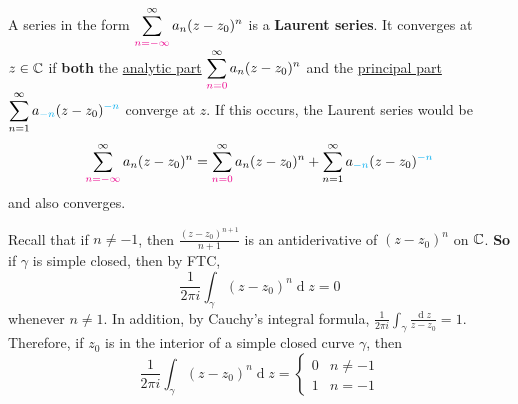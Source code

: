 \documentclass[12pt]{article}
\renewcommand{\d}{\ensuremath{\operatorname{d}}}
\begin{document}
 A series in the form $\displaystyle \sum_{\textcolor{magenta}{n=-\infty}}^{\infty}a_n(z-z_0)^n$ is a \textbf{Laurent series}. It converges at $z\in \mathbb{C}$ if \textbf{both} the \uline{analytic part} \(\displaystyle \sum_{\textcolor{magenta}{n=0}}^{\infty}a_n(z-z_0)^n\) and the \uline{principal part} \(\displaystyle \sum_{n=1}^{\infty}a_{\textcolor{cyan}{-n}}(z-z_0)^{\textcolor{cyan}{-n}}\) converge at $z$. If this occurs, the Laurent series would be \[\sum_{\textcolor{magenta}{n=-\infty}}^{\infty}a_n(z-z_0)^n = \sum_{\textcolor{magenta}{n=0}}^{\infty}a_n(z-z_0)^n +\sum_{n=1}^{\infty}a_{\textcolor{cyan}{-n}}(z-z_0)^{\textcolor{cyan}{-n}}\] and also converges.

\lemma Recall that if $n\neq -1$, then $\frac{(z-z_0)^{n+1}}{n+1}$ is an antiderivative of $(z-z_0)^n$ on $\mathbb{C}$. \textbf{So} if $\gamma$ is simple closed, then by FTC, \[\frac{1}{2\pi i}\int_{\gamma}(z-z_0)^n\d z=0\] whenever $n\neq 1$. In addition, by Cauchy's integral formula, $\frac{1}{2\pi i}\int_{\gamma}\frac{\d z}{z-z_0}=1$. Therefore, if $z_0$ is in the interior of a simple closed curve $\gamma$, then \[\frac{1}{2\pi i}\int_{\gamma}(z-z_0)^n\d z= \begin{cases}
    0 & n\neq -1\\
    1 & n=-1
\end{cases}\]
\end{document}
